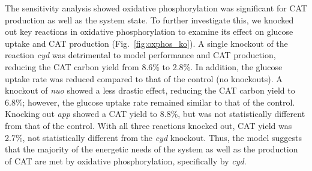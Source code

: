 \documentclass[12pt]{article}
\begin{document}
The sensitivity analysis showed oxidative phosphorylation was significant for CAT production as well as the system state. 
To further investigate this, we knocked out key reactions in oxidative phosphorylation to examine its effect on glucose uptake and CAT production (Fig.~\ref{fig:oxphos_ko}).
A single knockout of the reaction \textit{cyd} was detrimental to model performance and CAT production, reducing the CAT carbon yield from 8.6\% to 2.8\%.
In addition, the glucose uptake rate was reduced compared to that of the control (no knockouts).
A knockout of \textit{nuo} showed a less drastic effect, reducing the CAT carbon yield to 6.8\%; however, the glucose uptake rate remained similar to that of the control. 
Knocking out \textit{app} showed a CAT yield to 8.8\%, but was not statistically different from that of the control.  
With all three reactions knocked out, CAT yield was 2.7\%, not statistically different from the \textit{cyd} knockout. 
Thus, the model suggests that the majority of the energetic needs of the system as well as the production of CAT are met by oxidative phosphorylation, specifically by \textit{cyd}. 
\end{document}
